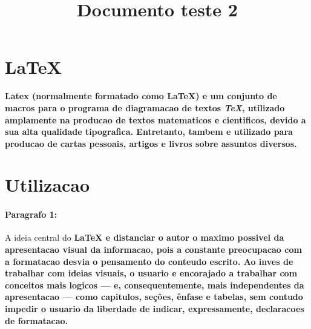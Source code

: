 \documentclass{article}
\title{Documento teste 2}
\begin{document}

\section{LaTeX}


\bf{Latex} (normalmente formatado como \bf{LaTeX}) e um conjunto de macros para o programa de diagramacao de textos \textit{TeX}, utilizado amplamente na producao de textos matematicos e cientificos, devido a sua alta qualidade tipografica. Entretanto, tambem e utilizado para producao de cartas pessoais, artigos e livros sobre assuntos diversos.


\section{Utilizacao}

\paragraph{Paragrafo 1:}
A ideia central do \bf{LaTeX} e distanciar o autor o maximo possivel da apresentacao visual da informacao, pois a constante preocupacao com a formatacao desvia o pensamento do conteudo escrito.
Ao inves de trabalhar com ideias visuais, o usuario e encorajado a trabalhar com conceitos mais logicos — e, consequentemente, mais independentes da apresentacao — como capitulos, seções, ênfase e tabelas, sem contudo impedir o usuario da liberdade de indicar, expressamente, declaracoes de formatacao.
\end{document}
